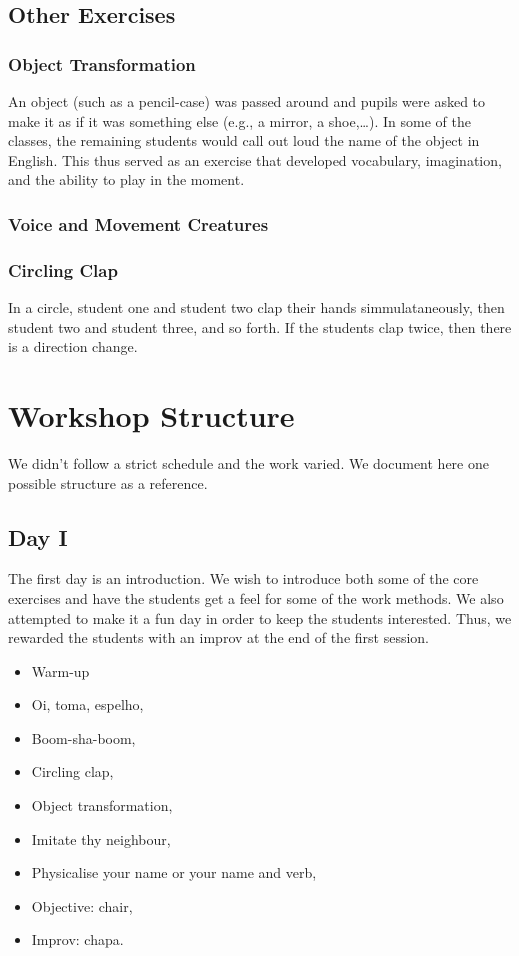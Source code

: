 \documentclass[article,twocolumn,twoside]{memoir}
\begin{document}
\section{Other Exercises}
\subsection{Object Transformation}
An object (such as a pencil-case) was passed around and pupils were asked to
make it as if it was something else (e.g., a mirror, a shoe,\dots). In some of
the classes, the remaining students would call out loud the name of the object
in English. This thus served as an exercise that developed vocabulary, imagination,
and the ability to play in the moment.

\subsection{Voice and Movement Creatures}
\subsection{Circling Clap}
In a circle, student one and student two clap their hands simmulataneously,
then student two and student three, and so forth. If the students clap twice,
then there is a direction change.

\chapter{Workshop Structure}

We didn't follow a strict schedule and the work varied. We document here one
possible structure as a reference.

\section{Day I}
The first day is an introduction. We wish to introduce both some of the core
exercises and have the students get a feel for some of the work methods. We
also attempted to make it a fun day in order to keep the students interested.
Thus, we rewarded the students with an improv at the end of the first session.

\begin{itemize}
\item Warm-up
\item Oi, toma, espelho,
\item Boom-sha-boom,
\item Circling clap,
\item Object transformation,
\item Imitate thy neighbour,
\item Physicalise your name or your name and verb,
\item Objective: chair,
\item Improv: chapa.
\end{itemize}
\end{document}
